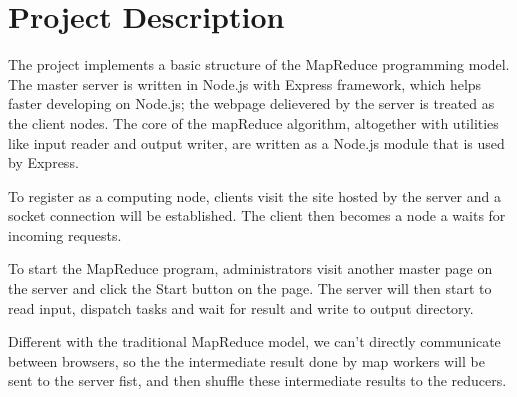 \section{Project Description}

The project implements a basic structure of the MapReduce programming model. The master server is written in Node.js with Express framework, which helps faster developing on Node.js; the webpage delievered by the server is treated as the client nodes. The core of the mapReduce algorithm, altogether with utilities like input reader and output writer, are written as a Node.js module that is used by Express.

To register as a computing node, clients visit the site hosted by the server and a socket connection will be established. The client then becomes a node a waits for incoming requests.

To start the MapReduce program, administrators visit another master page on the server and click the Start button on the page. The server will then start to read input, dispatch tasks and wait for result and write to output directory.

Different with the traditional MapReduce model, we can’t directly communicate between browsers, so the the intermediate result done by map workers will be sent to the server fist, and then shuffle these intermediate results to the reducers.
